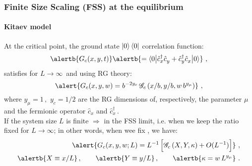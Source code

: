 \begin{frame}
\frametitle{Finite Size Scaling (FSS) at the equilibrium}
\framesubtitle{Kitaev model}
\small
At the critical point, the \alert{ground state} $\ket{0}\bra{0}$ correlation function:
\begin{equation}
\label{correlations}
\alertb{
G_c(x,y,t)}  \alertb{ =  
\braket{0 \big| \hat c_{x}^\dagger \hat
  c_{y}^{\phantom\dagger} + \hat c_{y}^\dagger \hat
  c_{x}^{\phantom\dagger} \big| 0}}\,\,,%
\end{equation}
satisfies for $L\to \infty\,$ and using RG theory:
\begin{equation}
\alert{
G_{c}(x,y,w)= b^{-2y_c} \,\mathscr{G}_{c} \left( x/b, y/b, w \,b^{y_\mu}\right)} \,\,,
\end{equation}
where $y_\mu=1\,,\,\,y_c=1/2$ are the RG dimensions of, respectively, the parameter $\mu$ and the fermionic operator $\hat c_x$ and $\hat c_x^\dagger\,$.\\
$ $\\
$ $\\
$ $\\
If the system size $L$ is finite \alert{$\Longrightarrow$} in the FSS limit, i.e. when we keep the ratio  fixed for $L \to \infty$; in other words, when wee fix , we have:
\begin{eqnarray}  
\label{scalKitaev}
\alert{
G_{c}(x,y,w; L)= L^{-1} \,\Bigr[\mathscr{G}_{c} \left( X, Y, \kappa\right) + O(L^{-1}) \Bigr]} \,\,,\\
\alertb{X \equiv x/L}\,, \qquad \alertb{Y \equiv y/L}\,, \qquad \alertb{\kappa = w \,L^{y_\mu} }\,\,.
\end{eqnarray}

\end{frame}
